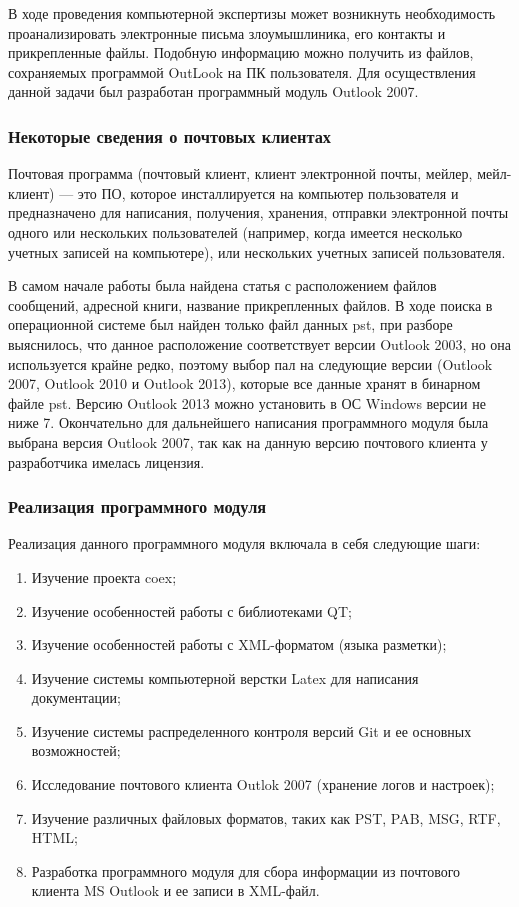 
В ходе проведения компьютерной экспертизы может возникнуть необходимость проанализировать электронные письма злоумышлиника, его контакты и прикрепленные  
файлы. Подобную информацию можно получить из файлов, сохраняемых программой OutLook  на ПК пользователя. Для  
осуществления данной задачи был разработан программный модуль Outlook 2007.

\subsubsection{Некоторые сведения о почтовых клиентах}

Почтовая программа (почтовый клиент, клиент электронной почты, мейлер, мейл-клиент) --- 
это ПО, которое инсталлируется на компьютер пользователя и предназначено для написания, получения, хранения, отправки электронной почты одного  
или нескольких пользователей (например, когда имеется несколько учетных записей на компьютере), или нескольких учетных записей пользователя. 


В  самом начале работы была найдена статья с расположением файлов сообщений, адресной книги, название прикрепленных файлов. В ходе поиска в  
операционной системе был найден только файл данных  pst, при разборе выяснилось, что данное расположение соответствует версии Outlook 2003, но она  
используется крайне редко, поэтому выбор пал на следующие версии  (Outlook 2007, Outlook 2010 и Outlook 2013), которые все данные хранят в бинарном  
файле pst. Версию  Outlook 2013 можно установить  в ОС Windows версии не ниже 7. Окончательно для дальнейшего написания программного модуля была выбрана версия Outlook 2007, так как на данную версию почтового клиента у разработчика имелась лицензия. 

\subsubsection{Реализация программного модуля}

Реализация данного программного модуля включала в себя следующие шаги:

\begin{enumerate}
\item Изучение проекта coex;
\item Изучение особенностей работы с библиотеками QT;
\item Изучение особенностей работы с XML-форматом (языка разметки);
\item Изучение системы компьютерной верстки  Latex для написания документации;
\item Изучение системы распределенного контроля версий Git и ее основных возможностей; 
\item Исследование почтового клиента Outlok 2007 (хранение логов и настроек);
\item Изучение различных файловых форматов, таких как PST, PAB, MSG, RTF, HTML;
\item Разработка программного модуля для сбора информации из почтового клиента MS Outlook и ее записи в XML-файл.
\end{enumerate}

